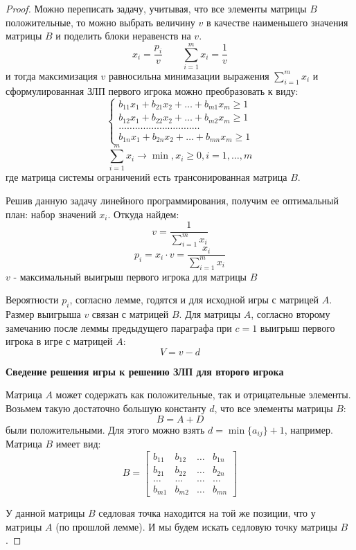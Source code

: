 \documentclass[aps,%
12pt,%
final,%
oneside,
onecolumn,%
musixtex, %
superscriptaddress,%
centertags]{article} %
\theoremstyle{plain}
\theoremstyle{definition}
\theoremstyle{remark}
\begin{document}
\begin{proof}
Можно переписать задачу, учитывая, что все элементы матрицы $B$ положительные, то можно выбрать величину $v$ в качестве наименьшего значения матрицы $B$ и поделить блоки неравенств на $v$.
$$x_i = \frac{p_i}{v} \qquad \sum\limits_{i=1}^m x_i = \frac{1}{v}$$
и тогда максимизация $v$ равносильна минимазации выражения $\sum\limits_{i=1}^m x_i$ и сформулированная ЗЛП первого игрока можно преобразовать к виду:
$$\begin{cases}
  b_{11}x_1+b_{21}x_2 + \ldots + b_{m1}x_m \geq 1 \\
  b_{12}x_1+b_{22}x_2 + \ldots + b_{m2}x_m \geq 1 \\
  \ldots \ldots \ldots \ldots \ldots\ldots \ldots \ldots \ldots \ldots  \\
  b_{1n}x_1+b_{2n}x_2 + \ldots + b_{mn}x_m \geq 1
\end{cases}$$
$$\sum\limits_{i=1}^m x_i \to \min, x_i \geq 0, i = 1,\ldots,m$$
где матрица системы ограничений есть трансонированная матрица $B$.

Решив данную задачу линейного программирования, получим ее оптимальный план: набор значений $x_i$. Откуда найдем:
$$v = \frac{1}{\sum\limits_{i=1}^m x_i}$$
$$p_i = x_i \cdot v = \frac{x_i}{\sum\limits_{i=1}^m x_i}$$
$v$ - максимальный выигрыш первого игрока для матрицы $B$

Вероятности $p_i$, согласно лемме, годятся и для исходной игры с матрицей $A$. Размер выигрыша $v$ связан с матрицей $B$. Для матрицы $A$, согласно второму замечанию после леммы предыдущего параграфа при $c=1$ выигрыш первого игрока в игре с матрицей $A$:
$$V = v - d$$

\textbf{Сведение решения игры к решению ЗЛП для второго игрока}

Матрица $A$ может содержать как положительные, так и отрицательные элементы. Возьмем такую достаточно большую константу $d$, что все элементы матрицы $B$:
$$B = A + D$$
были положительными. Для этого можно взять $d = \min \{a_{ij}\} + 1$, например. Матрица $B$ имеет вид:
$$B = \begin{bmatrix}
  b_{11} & b_{12} & \ldots & b_{1n} \\
  b_{21} & b_{22} & \ldots & b_{2n} \\
  \ldots & \ldots & \ldots & \ldots \\
  b_{m1} & b_{m2} & \ldots & b_{mn}
\end{bmatrix}$$

У данной матрицы $B$ седловая точка находится на той же позиции, что у матрицы $A$ (по прошлой лемме). И мы будем искать седловую точку матрицы $B$.


\end{proof}
\end{document}

